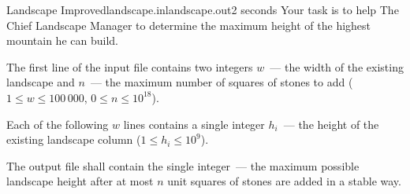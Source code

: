 \begin{problem}{Landscape Improved}{landscape.in}{landscape.out}{2 seconds}
Your task is to help The Chief Landscape Manager to determine the maximum height of 
the highest mountain he can build.

\InputFile

The first line of the input file contains two integers 
$w$~--- the width of the existing landscape and 
$n$~--- the maximum number of squares of stones to add
($1 \le w \le 100\,000$, $0 \le n \le 10^{18}$).

Each of the following $w$ lines contains a single integer
$h_i$~--- the height of the existing landscape column
($1 \le h_i \le 10^9$).

\OutputFile

The output file shall contain the single integer~--- 
the maximum possible landscape height after at most $n$ unit squares
of stones are added in a stable way.

\Example

\begin{example}%
%
%
\end{example}

\end{problem}
